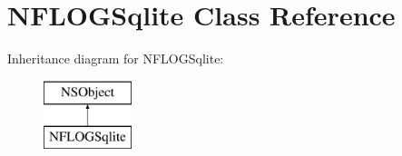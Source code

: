 \hypertarget{interface_n_f_l_o_g_sqlite}{}\section{N\+F\+L\+O\+G\+Sqlite Class Reference}
\label{interface_n_f_l_o_g_sqlite}
Inheritance diagram for N\+F\+L\+O\+G\+Sqlite\+:\begin{figure}[H]
\begin{center}
\leavevmode
\includegraphics[height=2.000000cm]{interface_n_f_l_o_g_sqlite}
\end{center}
\end{figure}
